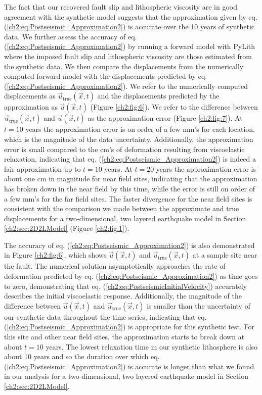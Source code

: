 The fact that our recovered fault slip and lithospheric viscosity are
in good agreement with the synthetic model suggests that the
approximation given by eq. (\ref{ch2:eq:Postseismic_Approximation2})
is accurate over the 10 years of synthetic data.  We further assess
the accuracy of eq. (\ref{ch2:eq:Postseismic_Approximation2}) by
running a forward model with PyLith where the imposed fault slip and
lithospheric viscosity are those estimated from the synthetic data. We
then compare the displacements from the numerically computed forward
model with the displacements predicted by eq.
(\ref{ch2:eq:Postseismic_Approximation2}).  We refer to the
numerically computed displacements as
$\vec{u}_{\mathrm{true}}(\vec{x},t)$ and the displacements predicted
by the approximation as $\vec{u}(\vec{x},t)$ (Figure \ref{ch2:fig:6}).
We refer to the difference between
$\vec{u}_{\mathrm{true}}(\vec{x},t)$ and $\vec{u}(\vec{x},t)$ as the
approximation error (Figure \ref{ch2:fig:7}). At $t=10$ years the
approximation error is on order of a few mm's for each location, which
is the magnitude of the data uncertainty.  Additionally, the
approximation error is small compared to the cm's of deformation
resulting from viscoelastic relaxation, indicating that eq.
(\ref{ch2:eq:Postseismic_Approximation2}) is indeed a fair
approximation up to $t=10$ years.  At $t=20$ years the approximation
error is about one cm in magnitude for near field sites, indicating
that the approximation has broken down in the near field by this time,
while the error is still on order of a few mm's for the far field
sites.  The faster divergence for the near field sites is consistent
with the comparison we made between the approximate and true
displacements for a two-dimensional, two layered earthquake model in
Section \ref{ch2:sec:2D2LModel} (Figure \ref{ch2:fig:1}).

The accuracy of eq. (\ref{ch2:eq:Postseismic_Approximation2}) is also
demonstrated in Figure \ref{ch2:fig:6}, which shows
$\vec{u}(\vec{x},t)$ and $\vec{u}_{\mathrm{true}}(\vec{x},t)$ at a
sample site near the fault. The numerical solution asymptotically
approaches the rate of deformation predicted by eq.
(\ref{ch2:eq:Postseismic_Approximation2}) as time goes to zero,
demonstrating that eq. (\ref{ch2:eq:PostseismicInitialVelocity})
accurately describes the initial viscoelastic response.  Additionally,
the magnitude of the difference between $\vec{u}(\vec{x},t)$ and
$\vec{u}_{\mathrm{true}}(\vec{x},t)$ is smaller than the uncertainty
of our synthetic data throughout the time series, indicating that eq.
(\ref{ch2:eq:Postseismic_Approximation2}) is appropriate for this
synthetic test.  For this site and other near field sites, the
approximation starts to break down at about $t=10$ years. The lowest
relaxation time in our synthetic lithosphere is also about 10 years
and so the duration over which eq.
(\ref{ch2:eq:Postseismic_Approximation2}) is accurate is longer than
what we found in our analysis for a two-dimensional, two layered
earthquake model in Section \ref{ch2:sec:2D2LModel}.

